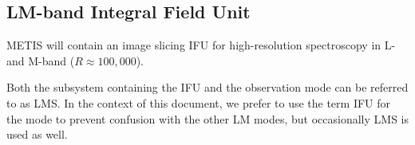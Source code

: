 

\subsection{LM-band Integral Field Unit}
\label{ssec:instrument_data_IFU}

METIS will contain an image slicing \ac{IFU} for
high-resolution spectroscopy in L- and M-band ($R\approx
100,000$).

Both the subsystem containing the \ac{IFU} and the observation mode can be referred to as \ac{LMS}.
In the context of this document, we prefer to use the term \ac{IFU} for the mode
to prevent confusion with the other LM modes, but occasionally \ac{LMS} is used as well.

